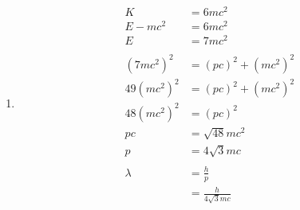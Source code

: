 \documentclass{article}
\begin{document}
\setcounter{subsubsection}{70}
\subsubsection{}

\begin{enumerate}
  \item

        \begin{align*}
          K            & = 6 m c^2                  \\
          E - m c^2    & = 6 m c^2                  \\
          E            & = 7 m c^2                  \\ \\
          (7 m c^2)^2  & = (p c)^2 + (m c^2)^2      \\
          49 (m c^2)^2 & = (p c)^2 + (m c^2)^2      \\
          48 (m c^2)^2 & = (p c)^2                  \\
          p c          & = \sqrt{48} m c^2          \\
          p            & = 4 \sqrt{3} m c           \\ \\
          \lambda      & = \frac{h}{p}              \\
                       & = \frac{h}{4 \sqrt{3} m c}
        \end{align*}
\end{enumerate}

\setcounter{subsubsection}{72}
\subsubsection{}
\end{document}
